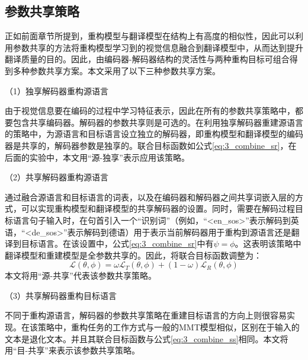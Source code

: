 \subsection{参数共享策略}
\label{sec:3_parameter_sharing}
% 
正如前面章节所提到，重构模型与翻译模型在结构上有高度的相似性，因此可以利用参数共享的方法将重构模型学习到的视觉信息融合到翻译模型中，从而达到提升翻译质量的目的。因此，由编码器-解码器结构的灵活性与两种重构目标可组合得到多种参数共享方案。本文采用了以下三种参数共享方案。

（1）{\sffamily 独享解码器重构源语言}


由于视觉信息要在编码的过程中学习特征表示，因此在所有的参数共享策略中，都要包含共享编码器。解码器的参数共享则是可选的。在利用独享解码器重建源语言的策略中，为源语言和目标语言设立独立的解码器，即重构模型和翻译模型的编码器是共享的，解码器参数是独享的。联合目标函数如公式\ref{eq:3_combine_sr}，在后面的实验中，本文用“源-独享”表示应用该策略。

（2）{\sffamily 共享解码器重构源语言}


通过融合源语言和目标语言的词表，以及在编码器和解码器之间共享词嵌入层的方式，可以实现重构模型和翻译模型的共享解码器的设置。同时，需要在解码过程目标语言句子输入时，在句首引入一个“识别词”（例如，“<en\_sos>”表示解码到英语，“<de\_sos>”表示解码到德语）用于表示当前解码器用于重构到源语言还是翻译到目标语言。在该设置中，公式\ref{eq:3_combine_sr}中有$\psi=\phi$。这表明该策略中翻译模型和重建模型是全参数共享的。因此，将联合目标函数调整为：
\begin{equation}
    \mathcal{L}(\theta, \phi)=\omega \mathcal{L}_T(\theta, \phi) + (1-\omega)\mathcal{L}_R(\theta, \phi)
    \label{eq:3_combine_ss}
\end{equation}
本文将用“源-共享”代表该参数共享策略。

（3）{\sffamily 共享解码器重构目标语言}


不同于重构源语言，解码器的参数共享策略在重建目标语言的方向上则很容易实现。在该策略中，重构任务的工作方式与一般的MMT模型相似，区别在于输入的文本是退化文本。并且其联合目标函数与公式\ref{eq:3_combine_ss}相同。本文将用“目-共享”来表示该参数共享策略。